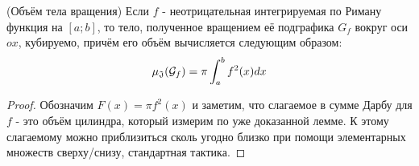 \begin{theorem} (Объём тела вращения)
	Если $f$ - неотрицательная интегрируемая по Риману функция на $[a; b]$, то тело, полученное вращением её подграфика $G_f$ вокруг оси $ox$, кубируемо, причём его объём вычисляется следующим образом:
	\[
		\operatorname{\mu_\mathfrak{J}}(\mathcal{G}_f) = \pi \int_a^b f^2(x)dx
	\]
\end{theorem}

\begin{proof}
	Обозначим $F(x) = \pi f^2(x)$ и заметим, что слагаемое в сумме Дарбу для $f$ - это объём цилиндра, который измерим по уже доказанной лемме. К этому слагаемому можно приблизиться сколь угодно близко при помощи элементарных множеств сверху/снизу, стандартная тактика.
\end{proof}